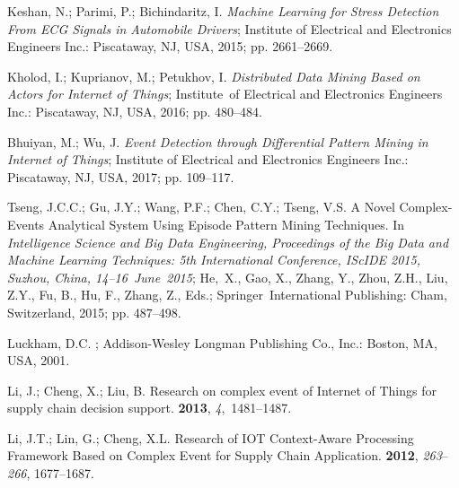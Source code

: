 \documentclass[symmetry,article,accept,moreauthors,pdftex10pt,a4paper]{mdpi}
\begin{document}
\begin{thebibliography}{999}
Keshan, N.; Parimi, P.; Bichindaritz, I.
\newblock \emph{Machine Learning for Stress Detection From ECG Signals in Automobile
	Drivers};
\newblock Institute of Electrical and Electronics Engineers Inc.: Piscataway, NJ, USA, 2015; pp.
2661--2669.

Kholod, I.; Kuprianov, M.; Petukhov, I.
\newblock \emph{Distributed Data Mining Based on Actors for Internet of Things};
\newblock Institute~of Electrical and Electronics Engineers Inc.: Piscataway, NJ, USA, 2016; pp.
480--484.

Bhuiyan, M.; Wu, J.
\newblock \emph{Event Detection through Differential Pattern Mining in Internet of
	Things};
\newblock Institute of Electrical and Electronics Engineers Inc.: Piscataway, NJ, USA, 2017; pp.
109--117.

Tseng, J.C.C.; Gu, J.Y.; Wang, P.F.; Chen, C.Y.; Tseng, V.S. A Novel
Complex-Events Analytical System Using Episode Pattern Mining Techniques.
\newblock In {\em Intelligence Science and Big Data Engineering, Proceedings of the Big Data and
	Machine Learning Techniques: 5th International Conference, IScIDE 2015,
	Suzhou, China, 14--16~June~2015}; He,~X.,
Gao, X., Zhang, Y., Zhou, Z.H., Liu, Z.Y., Fu, B., Hu, F., Zhang, Z., Eds.;
Springer~International Publishing: Cham, Switzerland, 2015; pp. 487--498.

Luckham, D.C.
; Addison-Wesley Longman Publishing Co.,
Inc.: Boston, MA, USA, 2001.

Li, J.; Cheng, X.; Liu, B.
\newblock Research on complex event of Internet of Things for supply chain
decision support.
 {\bf 2013}, {\em
	4},~1481--1487.

Li, J.T.; Lin, G.; Cheng, X.L.
\newblock Research of IOT Context-Aware Processing Framework Based on Complex
Event for Supply Chain Application.
 \textbf{ 2012}, \emph{263}--\emph{266}, 1677--1687.


\end{thebibliography}
\end{document}
